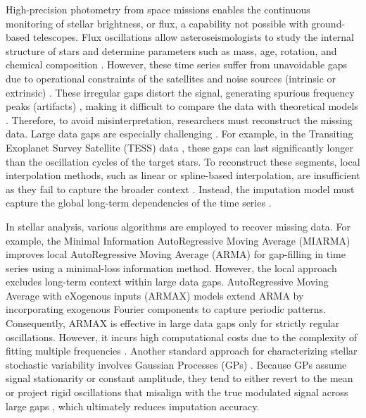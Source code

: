 \documentclass[a4paper,fleqn]{cas-sc}
\begin{document}
High-precision photometry from space missions enables the continuous monitoring of stellar brightness, or flux, a capability not possible with ground-based telescopes. Flux oscillation{\color{blue}s} {\color{blue}allow} asteroseismolog{\color{blue}ists} to study the internal structure of stars and determine parameters such as mass, age, rotation, and chemical composition \cite{aerts2010asteroseismology}. However, these time series suffer from unavoidable gaps due to operational constraints of the satellites and noise sources (intrinsic or extrinsic) \cite{hernandez2009asteroseismic}. These irregular gaps distort the signal, generating spurious frequency peaks (artifacts) \cite{aerts2010asteroseismology}, {\color{blue}making} it difficult to compare {\color{blue}the data} with theoretical models \cite{guo2024sub, kurtz2022asteroseismology}. Therefore, to avoid misinterpretation, researchers must reconstruct the missing data. Large data gaps are especially challenging \cite{weerakody2021review}. For example, in {\color{blue}the Transiting Exoplanet Survey Satellite (TESS)} data \cite{ricker2015transiting}, these gaps can last significantly longer than the oscillation cycles of the target stars. To reconstruct these segments, local interpolation methods, such as linear or spline-based interpolation, are insufficient as they fail to capture the broader context \cite{pascual2015miarma}. Instead, the imputation model must capture the global long-term dependencies of the time series \cite{rescigno2025gaussian}.

In stellar analysis, {\color{blue}various} algorithms {\color{blue}are employed} to recover {\color{blue}missing} data. For example, {\color{blue}the Minimal Information AutoRegressive Moving Average (MIARMA)} \cite{pascual2015miarma} improves local AutoRegressive Moving Average (ARMA) for gap-filling in time series using a minimal-loss information method. However, the local approach excludes long-term context within large data gaps. {\color{blue}AutoRegressive Moving Average with eXogenous inputs (ARMAX)} models extend ARMA by incorporating exogenous Fourier components \cite{hyndman2018forecasting} to capture periodic patterns. Consequently, ARMAX is effective in large data gaps only for strictly regular oscillations. However, it incurs high computational costs due to the complexity of fitting multiple frequencies \cite{hyndman2018forecasting}. Another standard approach for characterizing stellar stochastic variability involves Gaussian Processes (GPs) \cite{rescigno2025gaussian,foreman2017fast,boettner2025gallifrey}. Because GPs assume signal stationarity or constant amplitude, they tend to either revert to the mean or project rigid oscillations that misalign with the true modulated signal across large gaps \cite{foreman2017fast}, which ultimately reduces imputation accuracy.
\end{document}
